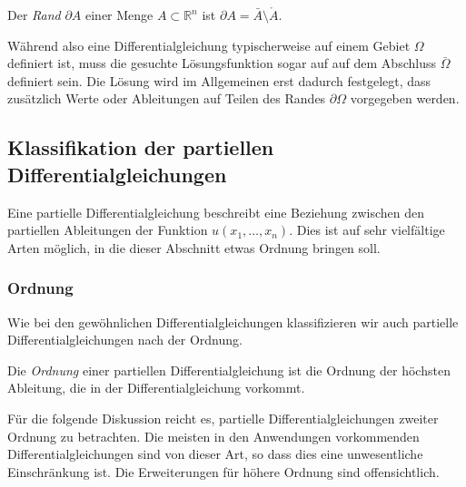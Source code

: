\begin{definition}
Der {\em Rand} $\partial A$ einer Menge $A\subset\mathbb R^n$ ist
$\partial A=\bar{A}\setminus\mathring{A}$.
\end{definition}

Während also eine Differentialgleichung typischerweise auf einem
Gebiet $\Omega$ definiert ist, muss die gesuchte Lösungsfunktion
sogar auf auf dem Abschluss $\bar{\Omega}$ definiert sein.
Die Lösung wird im Allgemeinen erst dadurch festgelegt, dass zusätzlich
Werte oder Ableitungen auf Teilen des Randes $\partial\Omega$ 
vorgegeben werden.

\subsection{Klassifikation der partiellen Differentialgleichungen
\label{subsection:pde:klassifikation}}
Eine partielle Differentialgleichung beschreibt eine Beziehung 
zwischen den partiellen Ableitungen der Funktion $u(x_1,\dots,x_n)$.
Dies ist auf sehr vielfältige Arten möglich, in die dieser Abschnitt
etwas Ordnung bringen soll.

\subsubsection{Ordnung}
Wie bei den gewöhnlichen Differentialgleichungen klassifizieren wir
auch partielle Differentialgleichungen nach der Ordnung.

\begin{definition}
Die {\em Ordnung} einer partiellen Differentialgleichung ist die
Ordnung der höchsten Ableitung, die in der Differentialgleichung
vorkommt.
\end{definition}

Für die folgende Diskussion reicht es, partielle Differentialgleichungen
zweiter Ordnung zu betrachten.
Die meisten in den Anwendungen vorkommenden Differentialgleichungen
sind von dieser Art, so dass dies eine unwesentliche Einschränkung ist.
Die Erweiterungen für höhere Ordnung sind offensichtlich.

